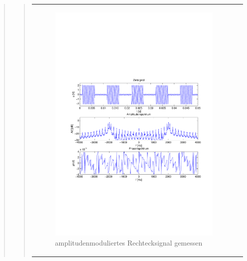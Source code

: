 \begin{quote}
\begin{quote}
\begin{center}
\begin{tabular}{ll}
\begin{minipage}{0.6\textwidth}
                     \begin{figure}[H]
                        \label{fig:}
                        \includegraphics[scale=0.5, trim = 2cm 6.5cm 1.5cm
                        8.5cm, clip]{./Bilder/Rechteckmodgemessen} %
                        \caption{amplitudenmoduliertes Rechtecksignal gemessen}
                    \end{figure}
               \vspace{-1.5em}

                \end{minipage}

            \end{tabular}
            \end{center}

        
        

\end{quote}
\end{quote}
